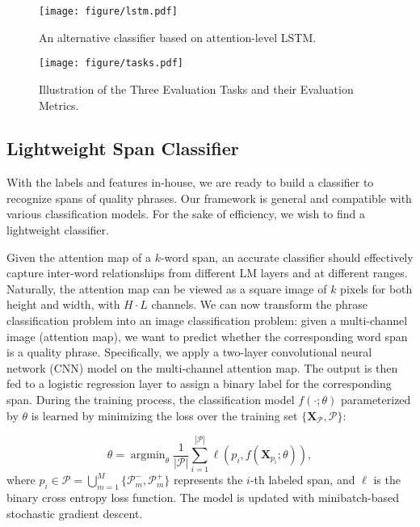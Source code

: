 \documentclass[sigconf]{acmart}
\DeclareMathOperator*{\argmin}{argmin}
\begin{document}
\begin{figure}[t]
    \centering
    \texttt{[image: figure/lstm.pdf]}
    \caption{An alternative classifier based on attention-level LSTM.}
    \label{fig:lstm}
\end{figure}

\begin{figure*}[t]
    \centering
    \texttt{[image: figure/tasks.pdf]}
    \caption{
    Illustration of the Three Evaluation Tasks and their Evaluation Metrics.
    }\label{fig:tasks}\vspace{-3mm}
\end{figure*}


\subsection{Lightweight Span Classifier}
\label{sec:classifier}

With the labels and features in-house, we are ready to build a classifier to recognize spans of quality phrases. 
Our framework is general and 
compatible with various classification models.
For the sake of efficiency, we wish to find a lightweight classifier. 

Given the attention map of a $k$-word span, an accurate classifier should effectively capture inter-word relationships from different LM layers and at different ranges.
Naturally, the attention map can be viewed as a square image of $k$ pixels for both height and width, with $H \cdot L$ channels.
We can now transform the phrase classification problem into an image classification problem: given a multi-channel image (attention map), we want to predict whether the corresponding word span is a quality phrase.
Specifically, we apply a two-layer convolutional neural network (CNN) model on the multi-channel attention map.
The output is then fed to a logistic regression layer to assign a binary label for the corresponding span. 
During the training process, the classification model $f(\cdot; \theta)$ parameterized by $\theta$ is learned by minimizing the loss over the training set $\{\mathbf{X}_{\mathcal{P}}, \mathcal{P}\}$:

$$
    \hat{\theta} = \argmin_\theta \frac{1}{|\mathcal{P}|} \sum^{|\mathcal{P}|}_{i=1} \ell(p_i, f(\mathbf{X}_{p_i}; \theta)),
$$
where $p_i \in \mathcal{P} = \bigcup\limits_{m=1}^M \{\mathcal{P}_m^-, \mathcal{P}_m^+\}$ represents the $i$-th labeled span, and $\ell$ is the binary cross entropy loss function.
The model is updated with minibatch-based stochastic gradient descent.
\end{document}
